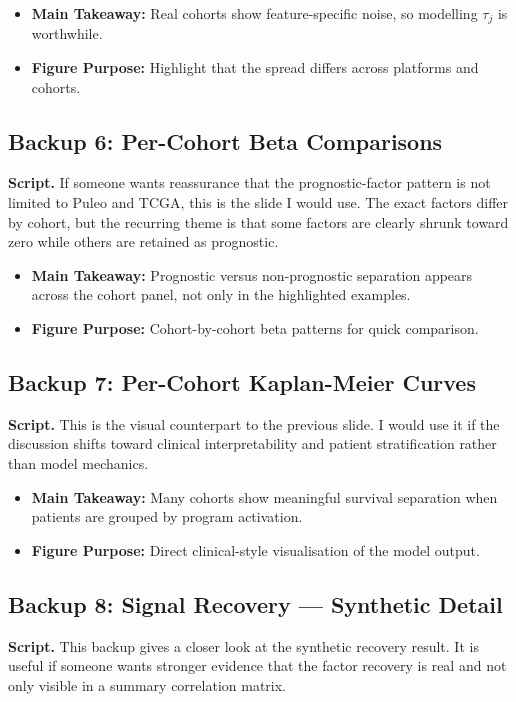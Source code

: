 \documentclass[11pt]{article}
\newcommand{\scriptlabel}{\textbf{Script. }}
\newcommand{\sectionlabel}[1]{\textbf{#1}}
\begin{document}
\begin{itemize}
\item \sectionlabel{Main Takeaway:} Real cohorts show feature-specific noise, so modelling $\tau_j$ is worthwhile.
\item \sectionlabel{Figure Purpose:} Highlight that the spread differs across platforms and cohorts.
\end{itemize}

\subsection*{Backup 6: Per-Cohort Beta Comparisons}
\scriptlabel If someone wants reassurance that the prognostic-factor pattern is not limited to Puleo and TCGA, this is the slide I would use. The exact factors differ by cohort, but the recurring theme is that some factors are clearly shrunk toward zero while others are retained as prognostic.

\begin{itemize}
\item \sectionlabel{Main Takeaway:} Prognostic versus non-prognostic separation appears across the cohort panel, not only in the highlighted examples.
\item \sectionlabel{Figure Purpose:} Cohort-by-cohort beta patterns for quick comparison.
\end{itemize}

\subsection*{Backup 7: Per-Cohort Kaplan-Meier Curves}
\scriptlabel This is the visual counterpart to the previous slide. I would use it if the discussion shifts toward clinical interpretability and patient stratification rather than model mechanics.

\begin{itemize}
\item \sectionlabel{Main Takeaway:} Many cohorts show meaningful survival separation when patients are grouped by program activation.
\item \sectionlabel{Figure Purpose:} Direct clinical-style visualisation of the model output.
\end{itemize}

\subsection*{Backup 8: Signal Recovery --- Synthetic Detail}
\scriptlabel This backup gives a closer look at the synthetic recovery result. It is useful if someone wants stronger evidence that the factor recovery is real and not only visible in a summary correlation matrix.
\end{document}
